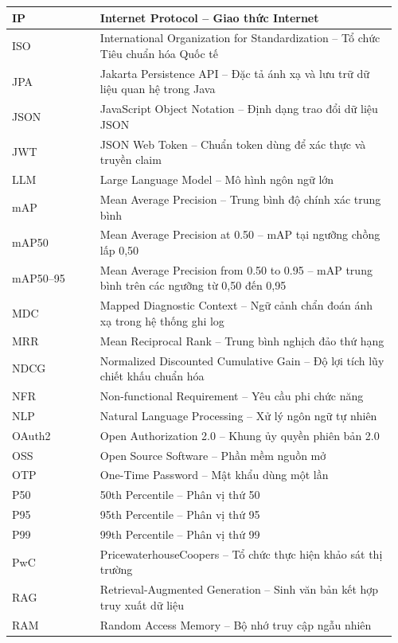 \begin{longtable}{|p{0.22\linewidth}|p{0.74\linewidth}|}
IP & Internet Protocol -- Giao thức Internet \\ \hline
ISO & International Organization for Standardization -- Tổ chức Tiêu chuẩn hóa Quốc tế \\ \hline
JPA & Jakarta Persistence API -- Đặc tả ánh xạ và lưu trữ dữ liệu quan hệ trong Java \\ \hline
JSON & JavaScript Object Notation -- Định dạng trao đổi dữ liệu JSON \\ \hline
JWT & JSON Web Token -- Chuẩn token dùng để xác thực và truyền claim \\ \hline
LLM & Large Language Model -- Mô hình ngôn ngữ lớn \\ \hline
mAP & Mean Average Precision -- Trung bình độ chính xác trung bình \\ \hline
mAP50 & Mean Average Precision at 0.50 -- mAP tại ngưỡng chồng lấp 0,50 \\ \hline
mAP50--95 & Mean Average Precision from 0.50 to 0.95 -- mAP trung bình trên các ngưỡng từ 0,50 đến 0,95 \\ \hline
MDC & Mapped Diagnostic Context -- Ngữ cảnh chẩn đoán ánh xạ trong hệ thống ghi log \\ \hline
MRR & Mean Reciprocal Rank -- Trung bình nghịch đảo thứ hạng \\ \hline
NDCG & Normalized Discounted Cumulative Gain -- Độ lợi tích lũy chiết khấu chuẩn hóa \\ \hline
NFR & Non-functional Requirement -- Yêu cầu phi chức năng \\ \hline
NLP & Natural Language Processing -- Xử lý ngôn ngữ tự nhiên \\ \hline
OAuth2 & Open Authorization 2.0 -- Khung ủy quyền phiên bản 2.0 \\ \hline
OSS & Open Source Software -- Phần mềm nguồn mở \\ \hline
OTP & One-Time Password -- Mật khẩu dùng một lần \\ \hline
P50 & 50th Percentile -- Phân vị thứ 50 \\ \hline
P95 & 95th Percentile -- Phân vị thứ 95 \\ \hline
P99 & 99th Percentile -- Phân vị thứ 99 \\ \hline
PwC & PricewaterhouseCoopers -- Tổ chức thực hiện khảo sát thị trường \\ \hline
RAG & Retrieval-Augmented Generation -- Sinh văn bản kết hợp truy xuất dữ liệu \\ \hline
RAM & Random Access Memory -- Bộ nhớ truy cập ngẫu nhiên \\ \hline

\end{longtable}
